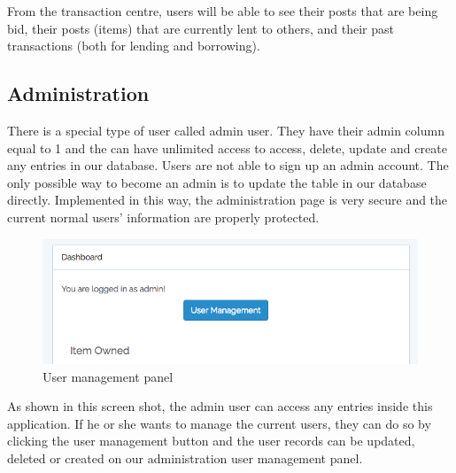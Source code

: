 From the transaction centre, users will be able to see their posts that are being bid, their posts (items) that are currently lent to others, and their past transactions (both for lending and borrowing).

\subsection{Administration}
There is a special type of user called admin user. They have their admin column equal to 1 and the can have unlimited access to access, delete, update and create any entries in our database. Users are not able to sign up an admin account. The only possible way to become an admin is to update the table in our database directly. Implemented in this way, the administration page is very secure and the current normal users' information are properly protected.
\begin{figure}[h]
      \centering
	\includegraphics[scale=0.3]{admin.png}
      \caption{User management panel}
\end{figure}
As shown in this screen shot, the admin user can access any entries inside this application. If he or she wants to manage the current users, they can do so by clicking the user management button and the user records can be updated, deleted or created on our administration user management panel.



